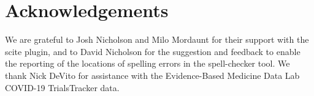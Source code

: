 \documentclass[sigconf]{acmart}
\begin{document}
\hypertarget{acknowledgements}{%
\section*{Acknowledgements}\label{acknowledgements}}

We are grateful to Josh Nicholson and Milo Mordaunt for their support with the scite plugin, and to David Nicholson for the suggestion and feedback to enable the reporting of the locations of spelling errors in the spell-checker tool.
We thank Nick DeVito for assistance with the Evidence-Based Medicine Data Lab COVID-19 TrialsTracker data.


	\balance
	
\end{document}
